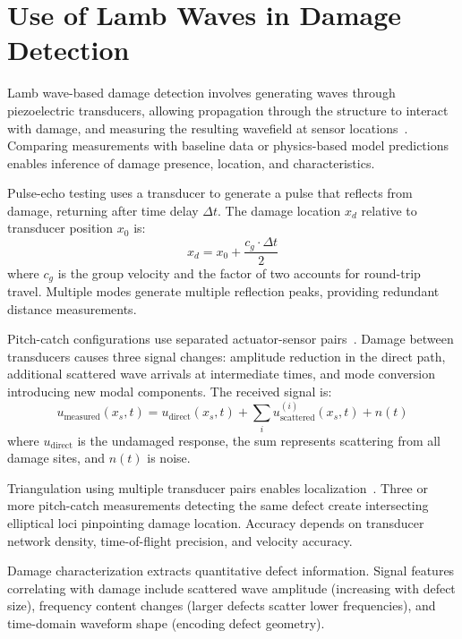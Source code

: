\documentclass[12pt,a4paper]{report}
\begin{document}
\section{Use of Lamb Waves in Damage Detection}

Lamb wave-based damage detection involves generating waves through piezoelectric transducers, allowing propagation through the structure to interact with damage, and measuring the resulting wavefield at sensor locations~\cite{giurgiutiu2005}. Comparing measurements with baseline data or physics-based model predictions enables inference of damage presence, location, and characteristics.

Pulse-echo testing uses a transducer to generate a pulse that reflects from damage, returning after time delay $\Delta t$. The damage location $x_d$ relative to transducer position $x_0$ is:
\begin{equation}
x_d = x_0 + \frac{c_g \cdot \Delta t}{2}
\end{equation}
where $c_g$ is the group velocity and the factor of two accounts for round-trip travel. Multiple modes generate multiple reflection peaks, providing redundant distance measurements.

Pitch-catch configurations use separated actuator-sensor pairs~\cite{su2009}. Damage between transducers causes three signal changes: amplitude reduction in the direct path, additional scattered wave arrivals at intermediate times, and mode conversion introducing new modal components. The received signal is:
\begin{equation}
u_{\text{measured}}(x_s, t) = u_{\text{direct}}(x_s, t) + \sum_{i} u_{\text{scattered}}^{(i)}(x_s, t) + n(t)
\end{equation}
where $u_{\text{direct}}$ is the undamaged response, the sum represents scattering from all damage sites, and $n(t)$ is noise.

Triangulation using multiple transducer pairs enables localization~\cite{giurgiutiu2008}. Three or more pitch-catch measurements detecting the same defect create intersecting elliptical loci pinpointing damage location. Accuracy depends on transducer network density, time-of-flight precision, and velocity accuracy.

Damage characterization extracts quantitative defect information. Signal features correlating with damage include scattered wave amplitude (increasing with defect size), frequency content changes (larger defects scatter lower frequencies), and time-domain waveform shape (encoding defect geometry).
\end{document}
